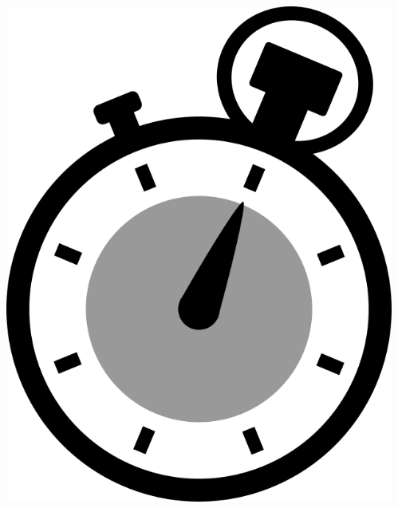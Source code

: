 \documentclass[pdflatex,compress]{beamer}
\begin{document}
\begin{frame}
\begin{columns}[onlytextwidth]
\begin{column}{0.4\textwidth}
      \includegraphics[scale=.125]{alarm.png}\\
      \vspace{.15cm}
    \end{column}
​    \end{columns}
\end{frame}
\end{document}
